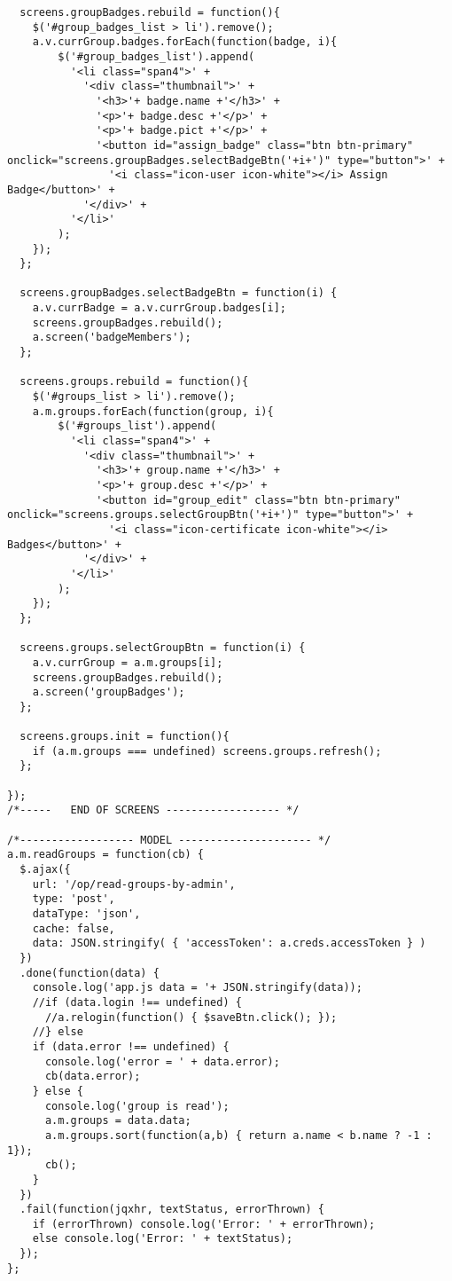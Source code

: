 \begin{lstlisting}
  screens.groupBadges.rebuild = function(){
    $('#group_badges_list > li').remove();
    a.v.currGroup.badges.forEach(function(badge, i){
        $('#group_badges_list').append(
          '<li class="span4">' +
            '<div class="thumbnail">' +
              '<h3>'+ badge.name +'</h3>' +
              '<p>'+ badge.desc +'</p>' +
              '<p>'+ badge.pict +'</p>' +
              '<button id="assign_badge" class="btn btn-primary" onclick="screens.groupBadges.selectBadgeBtn('+i+')" type="button">' +
                '<i class="icon-user icon-white"></i> Assign Badge</button>' + 
            '</div>' +
          '</li>'
        );  
    });
  };
  
  screens.groupBadges.selectBadgeBtn = function(i) {
    a.v.currBadge = a.v.currGroup.badges[i];
    screens.groupBadges.rebuild();
    a.screen('badgeMembers');
  };
  
  screens.groups.rebuild = function(){
    $('#groups_list > li').remove();
    a.m.groups.forEach(function(group, i){
        $('#groups_list').append(
          '<li class="span4">' +
            '<div class="thumbnail">' +
              '<h3>'+ group.name +'</h3>' +
              '<p>'+ group.desc +'</p>' +
              '<button id="group_edit" class="btn btn-primary" onclick="screens.groups.selectGroupBtn('+i+')" type="button">' +
                '<i class="icon-certificate icon-white"></i> Badges</button>' +
            '</div>' +
          '</li>'
        );  
    });
  };
  
  screens.groups.selectGroupBtn = function(i) {
    a.v.currGroup = a.m.groups[i];
    screens.groupBadges.rebuild();
    a.screen('groupBadges');
  };
  
  screens.groups.init = function(){
    if (a.m.groups === undefined) screens.groups.refresh();
  };
 
});
/*-----   END OF SCREENS ------------------ */

/*------------------ MODEL --------------------- */
a.m.readGroups = function(cb) { 
  $.ajax({
    url: '/op/read-groups-by-admin',
    type: 'post',
    dataType: 'json',
    cache: false,
    data: JSON.stringify( { 'accessToken': a.creds.accessToken } )
  })
  .done(function(data) {
    console.log('app.js data = '+ JSON.stringify(data));
    //if (data.login !== undefined) {
      //a.relogin(function() { $saveBtn.click(); });
    //} else 
    if (data.error !== undefined) {
      console.log('error = ' + data.error);
      cb(data.error);
    } else {
      console.log('group is read');
      a.m.groups = data.data;
      a.m.groups.sort(function(a,b) { return a.name < b.name ? -1 : 1});
      cb();
    }
  })
  .fail(function(jqxhr, textStatus, errorThrown) {
    if (errorThrown) console.log('Error: ' + errorThrown);
    else console.log('Error: ' + textStatus);
  });
}; 


\end{lstlisting}
